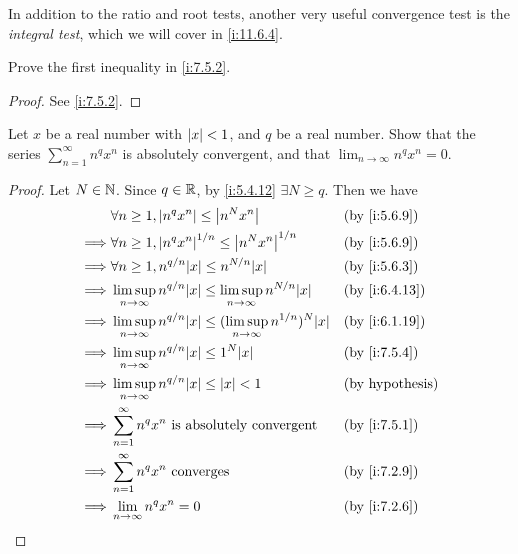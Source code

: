 \begin{rmk}\label{i:7.5.5}
  In addition to the ratio and root tests, another very useful convergence test is the \emph{integral test}, which we will cover in \cref{i:11.6.4}.
\end{rmk}

\exercisesection

\begin{ex}\label{i:ex:7.5.1}
  Prove the first inequality in \cref{i:7.5.2}.
\end{ex}

\begin{proof}
  See \cref{i:7.5.2}.
\end{proof}

\begin{ex}\label{i:ex:7.5.2}
  Let \(x\) be a real number with \(\left\lvert x\right\rvert < 1\), and \(q\) be a real number.
  Show that the series \(\sum_{n = 1}^\infty n^q x^n\) is absolutely convergent, and that \(\lim_{n \to \infty} n^q x^n = 0\).
\end{ex}

\begin{proof}
  Let \(N \in \mathbb{N}\).
  Since \(q \in \mathbb{R}\), by \cref{i:5.4.12} \(\exists N \geq q\).
  Then we have
  \begin{align*}
             & \forall n \geq 1, \abs{n^q x^n} \leq \abs{n^N x^n}                                         &  & \by{i:5.6.9}           \\
    \implies & \forall n \geq 1, \abs{n^q x^n}^{1 / n} \leq \abs{n^N x^n}^{1 / n}                         &  & \by{i:5.6.9}           \\
    \implies & \forall n \geq 1, n^{q / n} \abs{x} \leq n^{N / n} \abs{x}                                 &  & \by{i:5.6.3}           \\
    \implies & \limsup_{n \to \infty} n^{q / n} \abs{x} \leq \limsup_{n \to \infty} n^{N / n} \abs{x}     &  & \by{i:6.4.13}          \\
    \implies & \limsup_{n \to \infty} n^{q / n} \abs{x} \leq (\limsup_{n \to \infty} n^{1 / n})^N \abs{x} &  & \by{i:6.1.19}          \\
    \implies & \limsup_{n \to \infty} n^{q / n} \abs{x} \leq 1^N \abs{x}                                  &  & \by{i:7.5.4}           \\
    \implies & \limsup_{n \to \infty} n^{q / n} \abs{x} \leq \abs{x} < 1                                  &  & \text{(by hypothesis)} \\
    \implies & \sum_{n = 1}^\infty n^q x^n \text{ is absolutely convergent}                               &  & \by{i:7.5.1}           \\
    \implies & \sum_{n = 1}^\infty n^q x^n \text{ converges}                                              &  & \by{i:7.2.9}           \\
    \implies & \lim_{n \to \infty} n^q x^n = 0                                                            &  & \by{i:7.2.6}
  \end{align*}
\end{proof}

